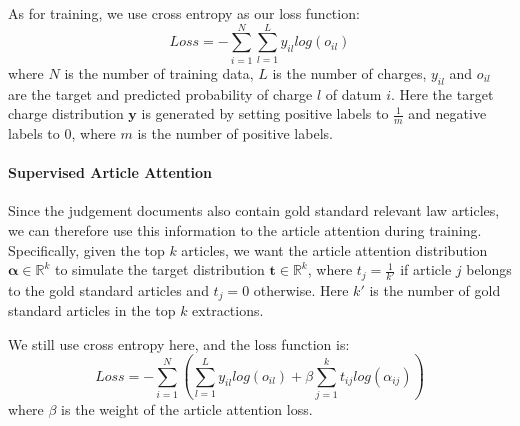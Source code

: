 As for training, we use cross entropy as our loss function:
\begin{equation}
\label{original_loss}
Loss= -\sum_{i=1}^N\sum_{l=1}^L{y_{il} log(o_{il})}
\end{equation} 
where $N$ is the number of training data, $L$ is the number of charges, $y_{il}$ and $o_{il}$ are the target and predicted probability of charge $l$ of datum $i$. Here the target charge distribution $\mathbf{y}$ is generated by setting positive labels to $\frac{1}{m}$ and negative labels to $0$, where $m$ is the number of positive labels.

\paragraph{Supervised Article Attention}
Since the judgement documents also contain gold standard relevant law articles, we can therefore use this information to  the article attention during training. Specifically, given the top $k$ articles, we want the article attention distribution $\bm{\alpha}\in\mathbb{R}^k$ to simulate the target distribution $\mathbf{t}\in\mathbb{R}^k$, where $t_j=\frac{1}{k'}$ if article $j$ belongs to the gold standard articles and $t_j=0$ otherwise. Here $k'$ is the number of gold standard articles in the top $k$ extractions.


We still use cross entropy here, and the loss function is:
\begin{equation}
\label{final_loss}
Loss = -\sum_{i=1}^N(\sum_{l=1}^L{y_{il} log(o_{il})} + \beta \sum_{j=1}^k{t_{ij} log(\alpha_{ij})})
\end{equation}
where $\beta$ is the weight of the article attention loss.



